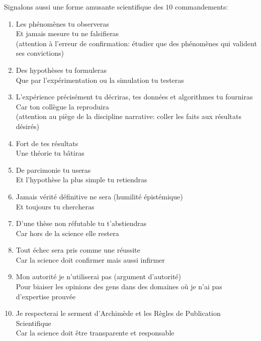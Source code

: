 Signalons aussi une forme amusante scientifique des $10$ commandements:
\begin{enumerate}
\item Les ph\'enomènes tu observeras\\
Et jamais mesure tu ne falsifieras \\
(attention à l'erreur de confirmation: \'etudier que des ph\'enomènes qui valident ses convictions)

\item Des hypothèses tu formuleras\\
Que par l'exp\'erimentation ou la simulation tu testeras

\item L'exp\'erience pr\'ecis\'ement tu d\'ecriras, tes donn\'ees et algorithmes tu fourniras\\
Car ton collègue la reproduira\\
(attention au piège de la discipline narrative: coller les faits aux r\'esultats d\'esir\'es)

\item Fort de tes r\'esultats\\
Une th\'eorie tu bâtiras

\item De parcimonie tu useras\\
Et l'hypothèse la plus simple tu retiendras

\item Jamais v\'erit\'e d\'efinitive ne sera (humilit\'e \'epist\'emique)\\
Et toujours tu chercheras

\item D'une thèse non r\'efutable tu t'abstiendras\\
Car hors de la science elle restera

\item Tout \'echec sera pris comme une r\'eussite\\
Car la science doit confirmer mais aussi infirmer

\item Mon autorit\'e je n'utiliserai pas (argument d'autorit\'e)\\
Pour biaiser les opinions des gens dans des domaines où je n'ai pas d'expertise prouv\'ee

\item Je respecterai le serment d'Archimède et les Règles de Publication Scientifique\\
Car la science doit être transparente et responsable
\end{enumerate}

